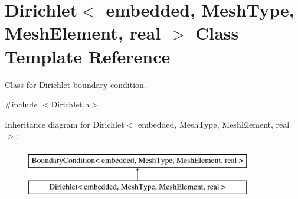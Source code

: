 \hypertarget{class_dirichlet}{\section{\-Dirichlet$<$ embedded, \-Mesh\-Type, \-Mesh\-Element, real $>$ \-Class \-Template \-Reference}
\label{class_dirichlet}
}


\-Class for \hyperlink{class_dirichlet}{\-Dirichlet} boundary condition.  




{\ttfamily \#include $<$\-Dirichlet.\-h$>$}

\-Inheritance diagram for \-Dirichlet$<$ embedded, \-Mesh\-Type, \-Mesh\-Element, real $>$\-:\begin{figure}[H]
\begin{center}
\leavevmode
\includegraphics[height=2.000000cm]{class_dirichlet}
\end{center}
\end{figure}
